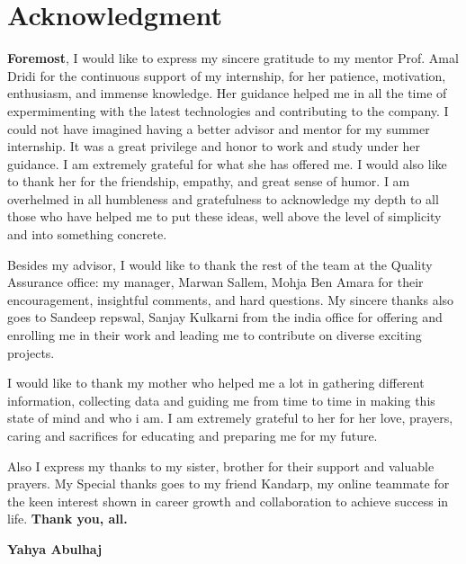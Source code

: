 

\chapter*{Acknowledgment}
\newline

\textbf{Foremost}, I would like to express my sincere gratitude to my mentor Prof. Amal Dridi for the continuous support of my internship, for her patience, motivation, enthusiasm, and immense knowledge. \newline Her guidance helped me in all the time of expermimenting with the latest technologies and contributing to the company.
I could not have imagined having a better advisor and mentor for my summer internship.
\newline
It was a great privilege and honor to work and study under her guidance. I am extremely
grateful for what she has offered me. I would also like to thank her for the
friendship, empathy, and great sense of humor. 
\newline
I am overhelmed in all humbleness and gratefulness to acknowledge my depth to all those who have helped me to put these ideas, well above the level of simplicity and into something concrete.
\newline

Besides my advisor, I would like to thank the rest of the team at the Quality Assurance office: my manager, Marwan Sallem, Mohja Ben Amara for their encouragement, insightful comments, and hard questions.\newline
My sincere thanks also goes to Sandeep repswal, Sanjay Kulkarni from the india office for offering and enrolling me in their work and leading me to contribute on diverse exciting projects.
\newline

I would like to thank my mother who helped me a lot in gathering different information, collecting data and guiding me from time to time in making this state of mind and who i am. I am extremely grateful to her for her love, prayers, caring and
sacrifices for educating and preparing me for my future.
\newline

Also I express my thanks to my sister,
brother for their support and valuable prayers. My
Special thanks goes to my friend Kandarp, my online teammate for the
keen interest shown in career growth and collaboration to achieve success in life.
\newline
\textbf{Thank you, all.}
\vskip1.5cm
\begin{flushright}\LARGE
\bf{Yahya Abulhaj}
\end{flushright}
